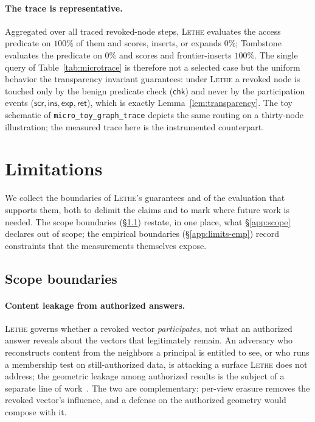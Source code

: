 \documentclass[sigconf, nonacm, review]{acmart}
\begin{document}
\paragraph{The trace is representative.}
Aggregated over all traced revoked-node steps, \textsc{Lethe} evaluates the
access predicate on $100\%$ of them and scores, inserts, or expands $0\%$;
Tombstone evaluates the predicate on $0\%$ and scores and frontier-inserts
$100\%$. The single query of Table~\ref{tab:microtrace} is therefore not a
selected case but the uniform behavior the transparency invariant guarantees:
under \textsc{Lethe} a revoked node is touched only by the benign predicate
check ($\mathsf{chk}$) and never by the participation events
($\mathsf{scr},\mathsf{ins},\mathsf{exp},\mathsf{ret}$), which is exactly
Lemma~\ref{lem:transparency}. The toy schematic of
\texttt{micro\_toy\_graph\_trace} depicts the same routing on a thirty-node
illustration; the measured trace here is the instrumented counterpart.


\section{Limitations}
\label{app:limits}

We collect the boundaries of \textsc{Lethe}'s guarantees and of the evaluation
that supports them, both to delimit the claims and to mark where future work is
needed. The scope boundaries (\S\ref{app:limits-scope}) restate, in one place,
what \S\ref{app:scope} declares out of scope; the empirical boundaries
(\S\ref{app:limits-emp}) record constraints that the measurements themselves
expose.

\subsection{Scope boundaries}
\label{app:limits-scope}

\paragraph{Content leakage from authorized answers.}
\textsc{Lethe} governs whether a revoked vector \emph{participates}, not what an
authorized answer reveals about the vectors that legitimately remain. An
adversary who reconstructs content from the neighbors a principal is entitled to
see, or who runs a membership test on still-authorized data, is attacking a
surface \textsc{Lethe} does not address; the geometric leakage among authorized
results is the subject of a separate line of
work~\cite{DBLP:conf/ccs/SongR20,DBLP:conf/emnlp/MorrisKSR23,DBLP:conf/icissp/AndersonAG25}.
The two are complementary: per-view erasure removes the revoked vector's
influence, and a defense on the authorized geometry would compose with it.
\end{document}
